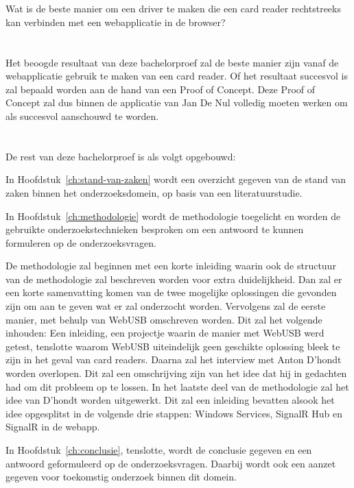 \section{}%
\label{sec:onderzoeksvraag}
Wat is de beste manier om een driver te maken die een card reader rechtstreeks kan verbinden met een webapplicatie in de browser?

\section{}%
\label{sec:onderzoeksdoelstelling}
Het beoogde resultaat van deze bachelorproef zal de beste manier zijn vanaf de webapplicatie gebruik te maken van een card reader. Of het resultaat succesvol is zal bepaald worden aan de hand van een Proof of Concept. Deze Proof of Concept zal dus binnen de applicatie van Jan De Nul volledig moeten werken om als succesvol aanschouwd te worden.


\section{}%
\label{sec:opzet-bachelorproef}


De rest van deze bachelorproef is als volgt opgebouwd:

In Hoofdstuk~\ref{ch:stand-van-zaken} wordt een overzicht gegeven van de stand van zaken binnen het onderzoeksdomein, op basis van een literatuurstudie.

In Hoofdstuk~\ref{ch:methodologie} wordt de methodologie toegelicht en worden de gebruikte onderzoekstechnieken besproken om een antwoord te kunnen formuleren op de onderzoeksvragen.

De methodologie zal beginnen met een korte inleiding waarin ook de structuur van de methodologie zal beschreven worden voor extra duidelijkheid. Dan zal er een korte samenvatting komen van de twee mogelijke oplossingen die gevonden zijn om aan te geven wat er zal onderzocht worden.
Vervolgens zal de eerste manier, met behulp van WebUSB omschreven worden. Dit zal het volgende inhouden: Een inleiding, een projectje waarin de manier met WebUSB werd getest, tenslotte waarom WebUSB uiteindelijk geen geschikte oplossing bleek te zijn in het geval van card readers.
Daarna zal het interview met Anton D'hondt worden overlopen. Dit zal een omschrijving zijn van het idee dat hij in gedachten had om dit probleem op te lossen.
In het laatste deel van de methodologie zal het idee van D'hondt worden uitgewerkt. Dit zal een inleiding bevatten alsook het idee opgesplitst in de volgende drie stappen: Windows Services, SignalR Hub en SignalR in de webapp.

In Hoofdstuk~\ref{ch:conclusie}, tenslotte, wordt de conclusie gegeven en een antwoord geformuleerd op de onderzoeksvragen. Daarbij wordt ook een aanzet gegeven voor toekomstig onderzoek binnen dit domein.